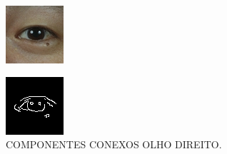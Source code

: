 \begin{figure}[h!]
    \caption{COMPONENTES CONEXOS OLHO DIREITO.}
    \centering
    \begin{minipage}[b]{0.33\textwidth}
        \centering
        \includegraphics[width=0.9\linewidth]{fig/02_detected_right_eye.png}
        \label{fig:olho}
    \end{minipage}
    \begin{minipage}[b]{0.33\textwidth}
        \centering
        \includegraphics[width=0.9\linewidth]{fig/03_right_eye_edge.png}

\end{minipage}
\end{figure}
